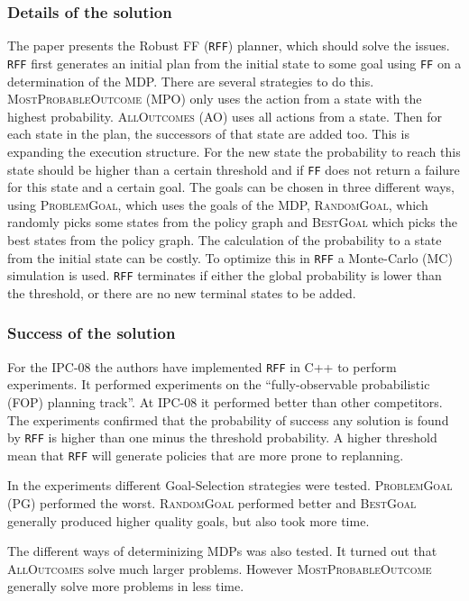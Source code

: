 \documentclass[runningheads,a4paper]{llncs}
\begin{document}
\subsubsection{Details of the solution}

The paper presents the Robust FF (\texttt{RFF}) planner, which should solve the
issues. \texttt{RFF} first generates an initial plan from the initial state to
some goal using \texttt{FF} on a determination of the MDP\@. There are several
strategies to do this. \textsc{MostProbableOutcome} (MPO) only uses the action
from a state with the highest probability. \textsc{AllOutcomes} (AO) uses all
actions from a state. Then for each state in the plan, the successors of that
state are added too. This is expanding the execution structure. For the new
state the probability to reach this state should be higher than a certain
threshold and if \texttt{FF} does not return a failure for this state and a
certain goal. The goals can be chosen in three different ways, using
\textsc{ProblemGoal}, which uses the goals of the MDP, \textsc{RandomGoal},
which randomly picks some states from the policy graph and \textsc{BestGoal}
which picks the best states from the policy graph. The calculation of the
probability to a state from the initial state can be costly. To optimize this
in \texttt{RFF} a Monte-Carlo (MC) simulation is used. \texttt{RFF} terminates
if either the global probability is lower than the threshold, or there are no
new terminal states to be added.


\subsubsection{Success of the solution}

For the IPC-08 the authors have implemented \texttt{RFF} in C++ to perform
experiments. It performed experiments on the ``fully-observable probabilistic
(FOP) planning track''. At IPC-08 it performed better than other competitors.
The experiments confirmed that the probability of success any solution is found
by \texttt{RFF} is higher than one minus the threshold probability. A higher
threshold mean that \texttt{RFF} will generate policies that are more prone to
replanning.

In the experiments different Goal-Selection strategies were tested.
\textsc{ProblemGoal} (PG) performed the worst. \textsc{RandomGoal} performed
better and \textsc{BestGoal} generally produced higher quality goals, but also
took more time.

The different ways of determinizing MDPs was also tested. It turned out that
\textsc{AllOutcomes} solve much larger problems. However
\textsc{MostProbableOutcome} generally solve more problems in less time.
\end{document}
